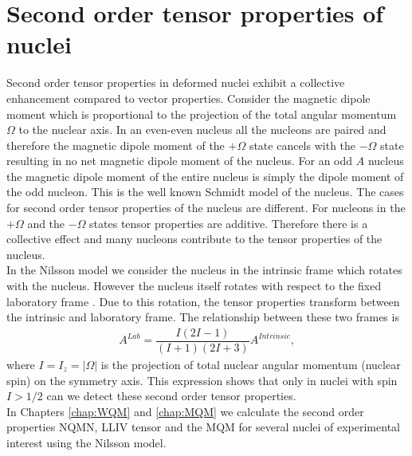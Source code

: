 \documentclass[10pt,a4paper, twoside, openright]{report}
\begin{document}
\section{Second order tensor properties of nuclei}
Second order tensor properties  in deformed nuclei exhibit a collective enhancement compared to vector properties. Consider the magnetic dipole moment  which is proportional to  the projection of the total angular momentum $\Omega$ to the nuclear axis. In an even-even nucleus all the nucleons are paired and therefore the magnetic dipole moment of the $+\Omega$ state cancels with the $-\Omega$ state resulting in no net magnetic dipole moment of the nucleus. For an odd $A$ nucleus  the magnetic dipole moment of the entire nucleus is simply the dipole moment of the odd nucleon. This is the well known Schmidt model of the nucleus. The cases for second order tensor properties of the nucleus are different. For  nucleons in the  $+\Omega$ and the $-\Omega$ states tensor properties  are additive. Therefore there is a collective effect and many nucleons contribute to the tensor properties of the nucleus.\\
\linebreak
In the Nilsson model we consider the nucleus in the intrinsic frame which rotates with the nucleus. However the nucleus itself rotates with respect to the fixed laboratory frame \cite{BohrMottVol2}. Due to this rotation, the tensor properties transform between the intrinsic  and laboratory frame. The relationship between these two frames is \cite{BohrMottVol2}
\begin{align} \label{eq:RotationalFactor}
A^{Lab} = \dfrac{I\left(2I - 1\right)}{\left(I + 1 \right)\left(2I + 3\right)}A^{Intrinsic},
\end{align}
where $I=I_z= \left|\Omega\right|$ is the projection of total nuclear angular momentum (nuclear spin) on the symmetry axis. This expression shows that only in nuclei with spin $I > 1/2$ can we detect these second order tensor properties. \\
\linebreak
In Chapters \ref{chap:WQM} and \ref{chap:MQM} we calculate the second order properties NQMN, LLIV tensor and the MQM for several nuclei of experimental interest using the Nilsson model.
\end{document}
